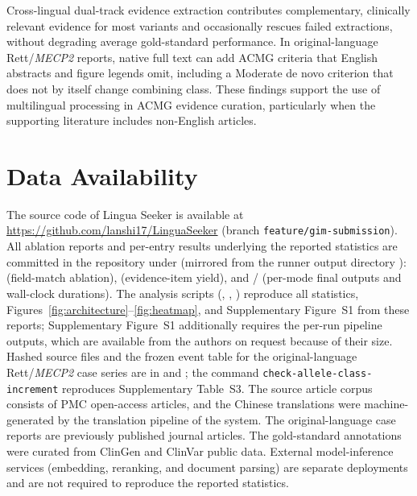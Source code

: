 \documentclass[preprint,12pt]{elsarticle}
\begin{document}
Cross-lingual dual-track evidence extraction
contributes complementary, clinically relevant evidence for most variants
and occasionally rescues failed extractions, without degrading average
gold-standard performance. In original-language Rett/\textit{MECP2}
reports, native full text can add ACMG criteria that English abstracts
and figure legends omit, including a Moderate de novo criterion that does
not by itself change combining class. These findings support the use of
multilingual processing in ACMG evidence curation, particularly when the
supporting literature includes non-English articles.

\section*{Data Availability}

The source code of Lingua Seeker is available at
\url{https://github.com/lanshi17/LinguaSeeker} (branch
\texttt{feature/gim-submission}). All ablation reports and per-entry
results underlying the reported statistics are committed in the
repository under  (mirrored from
the runner output directory ):
 (field-match ablation),
 (evidence-item yield),
and /
(per-mode final outputs and wall-clock durations). The analysis scripts
(,
,
) reproduce all
statistics, Figures~\ref{fig:architecture}--\ref{fig:heatmap}, and
Supplementary Figure~S1 from these reports; Supplementary Figure~S1
additionally requires the per-run pipeline outputs, which are available
from the authors on request because of their size. Hashed source files
and the frozen event table for the original-language Rett/\textit{MECP2}
case series are in
 and
;
the command \texttt{check-allele-class-increment} reproduces
Supplementary Table~S3. The source article corpus consists of PMC
open-access articles, and the Chinese translations
were machine-generated by the translation pipeline of the system. The
original-language case reports are previously published journal
articles. The
gold-standard annotations were curated from ClinGen and ClinVar public
data. External model-inference services (embedding, reranking, and
document parsing) are separate deployments and are not required to
reproduce the reported statistics.
\end{document}
